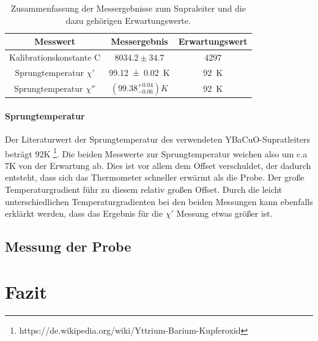 \documentclass[12pt,a4paper]{article}
\begin{document}
\begin{table}
\centering
\begin{tabular}{|c|c|c|}
\hline 
Messwert & Messergebnis & Erwartungswert \\
\hline 
Kalibrationskonstante C & $8034.2\pm 34.7$ & $4297$ \\ 
\hline 
Sprungtemperatur $\chi'$ & \SI{99.12\pm 0.02}{K} & \SI{92}{K} \\ 
\hline 
Sprungtemperatur $\chi''$ & $(99.38^{+0.04}_{-0.06}) K$ & \SI{92}{K} \\ 
\hline 
\end{tabular} 
\caption{Zusammenfassung der Messergebnisse zum Supraleiter und die dazu gehörigen Erwartungswerte.}
\label{tab:supra_ergebnis}
\end{table}

\paragraph{Sprungtemperatur}
Der Literaturwert der Sprungtemperatur des verwendeten YBaCuO-Supratleiters beträgt 92K \footnote{https://de.wikipedia.org/wiki/Yttrium-Barium-Kupferoxid}. Die beiden Messwerte zur Sprungtemperatur weichen also um c.a 7K von der Erwartung ab. Dies ist vor allem dem Offset verschuldet, der dadurch entsteht, dass sich das Thermometer schneller erwärmt als die Probe. Der große Temperaturgradient führ zu diesem relativ großen Offset. Durch die leicht unterschiedlichen Temperaturgradienten bei den beiden Messungen kann ebenfalls erklärkt werden, dass das Ergebnis für die $\chi'$ Messung etwas größer ist.
\subsection{Messung der Probe}

\section{Fazit}
\end{document}
